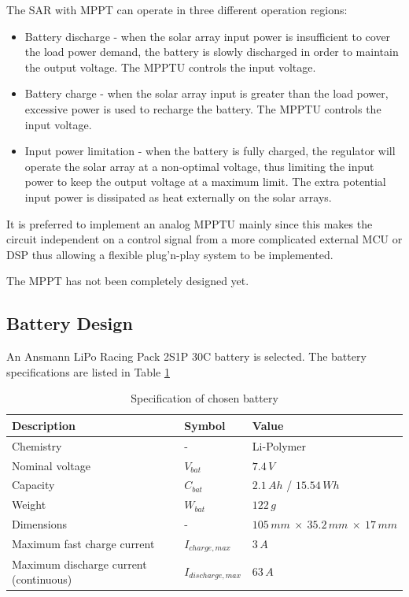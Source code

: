 The \ac{SAR} with \ac{MPPT} can operate in three different operation regions:
%
\begin{itemize}
\item Battery discharge - when the solar array input power is insufficient to cover the load power demand, the battery is slowly discharged in order to maintain the output voltage. The \ac{MPPTU} controls the input voltage.
\item Battery charge - when the solar array input is greater than the load power, excessive power is used to recharge the battery. The \ac{MPPTU} controls the input voltage.
\item Input power limitation - when the battery is fully charged, the regulator will operate the solar array at a non-optimal voltage, thus limiting the input power to keep the output voltage at a maximum limit. The extra potential input power is dissipated as heat externally on the solar arrays.
\end{itemize}

It is preferred to implement an analog \ac{MPPTU} mainly since this makes the circuit independent on a control signal from a more complicated external \ac{MCU} or \ac{DSP} thus allowing a flexible plug'n-play system to be implemented. 

The \ac{MPPT} has not been completely designed yet.


\subsection{Battery Design}
An Ansmann \ac{LiPo} Racing Pack 2S1P 30C battery is selected. The battery specifications are listed in Table \ref{tab:proposed_battery}

\begin{table}[H]
\centering
\caption{Specification of chosen battery}
\label{tab:proposed_battery}
\begin{tabular}{p{}p{}p{}}
\hline
\textbf{Description} & \textbf{Symbol} & \textbf{Value}\\
\hline 
Chemistry & - & Li-Polymer\\
Nominal voltage & $V_{bat}$ & $7.4\,V$\\
Capacity & $C_{bat}$ & $2.1\,Ah$ / $15.54\,Wh$\\
Weight & $W_{bat}$ & $122\,g$\\
Dimensions & - & $105\,mm\:\times\:35.2\,mm\:\times\:17\,mm$\\
Maximum fast charge current & $I_{charge,max}$ & $3\,A$\\
Maximum discharge current (continuous) & $I_{discharge,max}$ & $63\,A$\\
\hline
\end{tabular}
\end{table}


